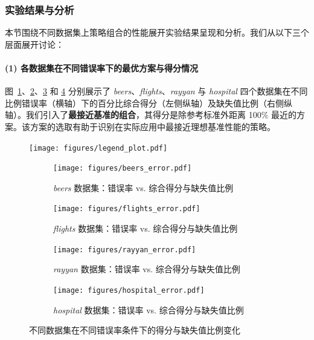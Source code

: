 \documentclass[10pt]{article} %
\numberwithin{equation}{section}
\begin{document}
\subsubsection{实验结果与分析}
\label{sec:exp_result_all}
本节围绕不同数据集上策略组合的性能展开实验结果呈现和分析。我们从以下三个层面展开讨论：
\paragraph{(1) 各数据集在不同错误率下的最优方案与得分情况}  
图~\ref{fig:beers_error}、\ref{fig:flights_error}、\ref{fig:rayyan_error} 和 \ref{fig:hospital_error} 分别展示了 \textit{beers}、\textit{flights}、\textit{rayyan} 与 \textit{hospital} 四个数据集在不同比例错误率（横轴）下的百分比综合得分（左侧纵轴）及缺失值比例（右侧纵轴）。我们引入了\textbf{最接近基准的组合}，其得分是除参考标准外距离 100\% 最近的方案。该方案的选取有助于识别在实际应用中最接近理想基准性能的策略。

\begin{figure}[htbp]
    \centering
    \texttt{[image: figures/legend\_plot.pdf]} %
    \vspace{-14pt} %
\end{figure}

\begin{figure}[htbp]
  \centering
  \begin{subfigure}{0.49\linewidth} %
    \centering
    \texttt{[image: figures/beers\_error.pdf]} %
    \caption{\textit{beers} 数据集：错误率 vs. 综合得分与缺失值比例}
    \label{fig:beers_error}
  \end{subfigure}
  \hfill
  \begin{subfigure}{0.49\linewidth}
    \centering
    \texttt{[image: figures/flights\_error.pdf]}
    \caption{\textit{flights} 数据集：错误率 vs. 综合得分与缺失值比例}
    \label{fig:flights_error}
  \end{subfigure}

  \vspace{0.5em} %

  \begin{subfigure}{0.49\linewidth}
    \centering
    \texttt{[image: figures/rayyan\_error.pdf]}
    \caption{\textit{rayyan} 数据集：错误率 vs. 综合得分与缺失值比例}
    \label{fig:rayyan_error}
  \end{subfigure}
  \hfill
  \begin{subfigure}{0.49\linewidth}
    \centering
    \texttt{[image: figures/hospital\_error.pdf]}
    \caption{\textit{hospital} 数据集：错误率 vs. 综合得分与缺失值比例}
    \label{fig:hospital_error}
  \end{subfigure}

  \caption{不同数据集在不同错误率条件下的得分与缺失值比例变化}
  \label{fig:all_datasets}
\end{figure}
\end{document}
